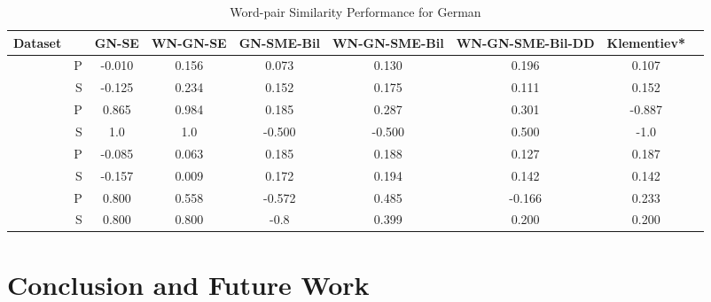 \documentclass[11pt]{article}
\begin{document}
\begin{table*}[ht]
\caption{Word-pair Similarity Performance for German } %
\label{tbl:de-wp-sim}
\centering  %
\tabcolsep=0.09cm
{\footnotesize
\begin{tabular}{cr c c c c c c c} %
\hline\hline %
 Dataset & & GN-SE  & WN-GN-SE & GN-SME-Bil &  WN-GN-SME-Bil & WN-GN-SME-Bil-DD & Klementiev*
\\ [0.5ex] 
\hline %
                                 &  P & -0.010  & 0.156 & 0.073 & 0.130&0.196 &0.107 \\[-1ex]
\raisebox{1.5ex}{wortpaare222}  &  S & -0.125 & 0.234& 0.152 & 0.175 & 0.111 &0.152 \\[1ex]

                                  &  P & 0.865 & 0.984 & 0.185 & 0.287 & 0.301 & -0.887 \\[-1ex]
\raisebox{1.5ex}{wortpaare30}    &  S & 1.0   & 1.0   & -0.500 & -0.500  & 0.500 & -1.0 \\[1ex]

                                  &  P & -0.085  & 0.063 & 0.185 & 0.188 & 0.127 &0.187 \\[-1ex]
\raisebox{1.5ex}{wortpaare350}  &  S & -0.157 & 0.009  &  0.172 & 0.194 & 0.142 &0.142 \\[1ex]

                                &  P & 0.800  & 0.558 & -0.572 & 0.485 & -0.166 & 0.233 \\[-1ex]
\raisebox{1.5ex}{wortpaare65}  &  S & 0.800 & 0.800 & -0.8 & 0.399 & 0.200 & 0.200 \\[1ex]


\hline %
     
          
 \hline %
\end{tabular}
}

\end{table*}      
          
            
     


 
\section{Conclusion and Future Work}





\end{document}
